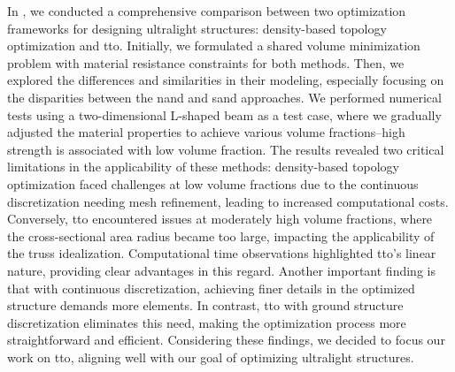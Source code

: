 In , we conducted a comprehensive comparison between two optimization frameworks for designing ultralight structures: density-based topology optimization and \gls{tto}. Initially, we formulated a shared volume minimization problem with material resistance constraints for both methods. Then, we explored the differences and similarities in their modeling, especially focusing on the disparities between the \gls{nand} and \gls{sand} approaches. We performed numerical tests using a two-dimensional L-shaped beam as a test case, where we gradually adjusted the material properties to achieve various volume fractions--\ie high strength is associated with low volume fraction. The results revealed two critical limitations in the applicability of these methods: density-based topology optimization faced challenges at low volume fractions due to the continuous discretization needing mesh refinement, leading to increased computational costs. Conversely, \gls{tto} encountered issues at moderately high volume fractions, where the cross-sectional area radius became too large, impacting the applicability of the truss idealization. Computational time observations highlighted \gls{tto}'s linear nature, providing clear advantages in this regard. Another important finding is that with continuous discretization, achieving finer details in the optimized structure demands more elements. In contrast, \gls{tto} with ground structure discretization eliminates this need, making the optimization process more straightforward and efficient. Considering these findings, we decided to focus our work on \gls{tto}, aligning well with our goal of optimizing ultralight structures.

